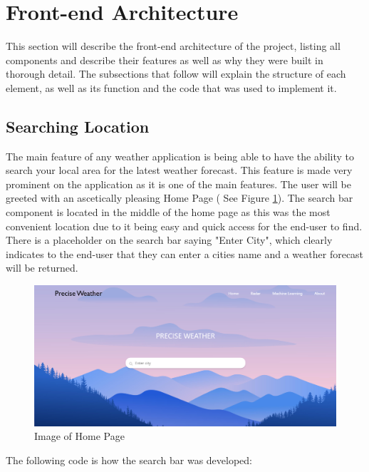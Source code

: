 \section{Front-end Architecture}
This section will describe the front-end architecture of the project, listing all components and describe their features as well as why they were built in thorough detail. The subsections that follow will explain the structure of each element, as well as its function and the code that was used to implement it.

\subsection{Searching Location}
The main feature of any weather application is being able to have the ability to search your local area for the latest weather forecast. This feature is made very prominent on the application as it is one of the main features. The user will be greeted with an ascetically pleasing Home Page ( See Figure \ref{HomePage}). The search bar component is located in the middle of the home page as this was the most convenient location due to it being easy and quick access for the end-user to find. There is a placeholder on the search bar saying "Enter City", which clearly indicates to the end-user that they can enter a cities name and a weather forecast will be returned.

\begin{figure}[h]
\centering
\includegraphics[scale=0.3]{img/HomePage.PNG}
\caption{Image of Home Page}
\label{HomePage}
\end{figure}

\newpage

The following code is how the search bar was developed:

